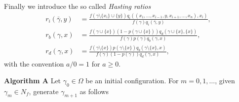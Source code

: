 \noindent Finally we introduce the so called \textit{Hasting ratios}
\begin{align*}
r_i(\bar \gamma,y) &= \frac{f(\gamma \setminus \{x_i\} \cup \{y\}) q_i((x_1,\dots,x_{i-1},y,x_{i+1},\dots,x_n), x_i) }{f(\gamma)q_i(\bar\gamma,y)}, \\
r_b(\gamma,x) &= \frac{f(\gamma \cup \{x\})(1-p(\gamma \cup \{x\})) q_d(\gamma \cup \{x\}, \{x\})}{f(\gamma)p(\gamma)q_b(\gamma,x)}, \\
r_d(\gamma,x) &= \frac{f(\gamma \setminus \{x\})p(\gamma \setminus\{x\}) q_b(\gamma \setminus \{x\}, x)}{f(\gamma)(1-p(\gamma))q_d(\gamma,x)},
\end{align*}
with the convention $a/0=1$ for $a\geq 0$.\newline

\noindent \textbf{Algorithm A}\newline
\noindent Let $\gamma_0 \in \Omega$ be an initial configuration. 
For $m=0,1,\dots$, given $\gamma_m \in N_f$, generate $\gamma_{m+1}$ as follows
